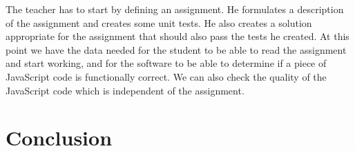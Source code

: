 \documentclass{article}
\begin{document}
The teacher has to start by defining an assignment. He formulates a description
of the assignment and creates some unit tests. He also creates a solution
appropriate for the assignment that should also pass the tests he created. At
this point we have the data needed for the student to be able to read the
assignment and start working, and for the software to be able to determine if a
piece of JavaScript code is functionally correct. We can also check the quality
of the JavaScript code which is independent of the assignment.

\section{Conclusion}



\end{document}
